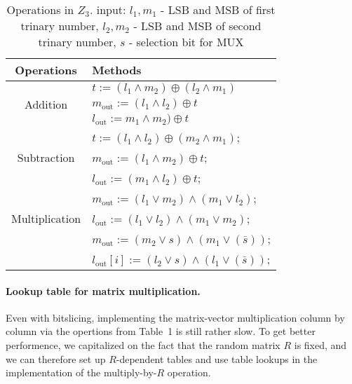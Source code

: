\begin{table}[ht]
	\caption{Operations in $Z_3$. input:   ${l_1}, {m_1}$ - LSB and MSB  of first trinary number, 
		${l_2}, {m_2}$ - LSB and MSB  of second trinary number,  ${s}$ - selection bit for MUX}
	\begin{center}
		\begin{tabular}{|c|l|}
			\hline
			\textbf{Operations} & \textbf{Methods}\\
			\hline
			\multirow{3}{*}{Addition} & ${t} := ({l_1 \wedge m_2}) \oplus ({l_2 \wedge m_1})$\\
			& $m_{\mathrm{out}} := ( l_1 \wedge  l_2 ) \oplus  t $ \\
			& $l_{\mathrm{out}} :=m_1 \wedge m_2 ) \oplus t $ \\
			\hline
			\multirow{3}{*}{Subtraction} & ${t} := ({l_1} \wedge {l_2}) \oplus ({m_2} \wedge {m_1})$;\\
			& $m_{\mathrm{out}} := (l_1 \wedge m_2 ) \oplus t$;\\
			& $l_{\mathrm{out}} := (m_1 \wedge l_2 ) \oplus t$; \\
			\hline
			\multirow{3}{*}{Multiplication} & $m_{\mathrm{out}}:= (l_1 \vee m_2) \wedge   (m_1 \vee l_2)$; \\
			& $l_{\mathrm{out}} := (l_1 \vee l_2) \wedge     (m_1 \vee m_2)$;\\
			\hline
			\multirow{3}{*}{MUX} & $m_{\mathrm{out}} :=( m_2 \vee s) \wedge (m_1 \vee (\bar{s}) )$; \\
			& $l_{\mathrm{out}}[i] :=( l_2 \vee s) \wedge (l_1 \vee (\bar{s}) )$; \\
			\hline
			
		\end{tabular}
	\end{center}
	\label{tab:multicol}
\end{table}

\paragraph{Lookup table for matrix multiplication.}
Even with bitslicing, implementing the matrix-vector multiplication column by column via the opertions from Table~1 is still rather slow.
To get better performence, we capitalized on the fact that the random matrix $R$ is fixed, and we can therefore set up $R$-dependent tables and use table lookups in the implementation of the multiply-by-$R$ operation.

